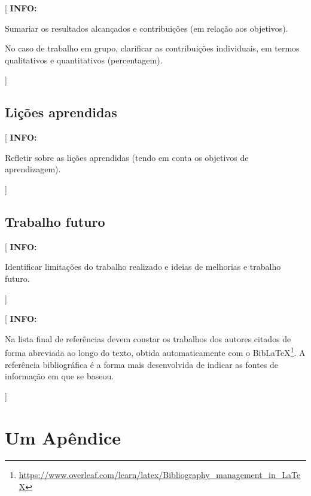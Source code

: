 \documentclass[11pt,a4paper]{report}
\newcommand{\class}[1]{{\normalfont\sffamily #1\/}}
\newenvironment{info}[1]{\vspace*{6mm}\color{blue}[ \textbf{INFO:} \begin{em} #1}{\vspace*{3mm}\end{em} ]}
\begin{document}
\begin{info}
Sumariar os resultados alcançados e contribuições (em relação aos  objetivos).

No caso de trabalho em grupo, clarificar as contribuições individuais, em termos qualitativos e quantitativos (percentagem).
\end{info}

\lipsum[10]

\section{Lições aprendidas}

\begin{info}
Refletir sobre as lições aprendidas (tendo em conta os objetivos de aprendizagem).
\end{info}

\lipsum[11]

\section{Trabalho futuro}

\begin{info}
Identificar limitações do trabalho realizado e ideias de melhorias e trabalho futuro.
\end{info}




\renewcommand{\bibname}{Referências bibliográficas}
\printbibliography
{}  %

\begin{info}
Na lista final de referências devem constar os trabalhos dos autores
citados de forma abreviada ao longo do texto, obtida automaticamente
com o \class{BibLaTeX}\footnote{\url{https://www.overleaf.com/learn/latex/Bibliography_management_in_LaTeX}}.
A referência bibliográfica é a forma mais desenvolvida de indicar as
fontes de informação em que se baseou. 
\end{info}


\appendix
\chapter{Um Apêndice}
\end{document}

